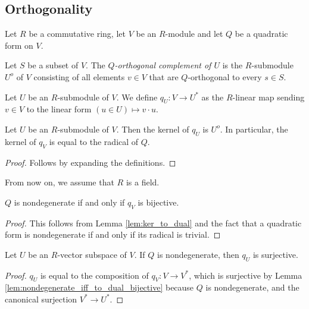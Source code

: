 \subsection{Orthogonality}\label{subsec:ortho}

Let $R$ be a commutative ring, let $V$ be an $R$-module and let $Q$ be a quadratic form on $V$.

\begin{definition}\label{def:ortho_compl}
\leanok
Let $S$ be a subset of $V$. The \emph{$Q$-orthogonal complement of $U$} is the $R$-submodule $U^o$ of $V$ consisting of all elements $v \in V$ that are $Q$-orthogonal to every $s \in S$.
\end{definition}

\begin{definition}\label{def:to_dual}
\leanok
Let $U$ be an $R$-submodule of $V$. We define $q_U : V \to U^*$ as the $R$-linear map sending $v \in V$ to the linear form $(u \in U) \mapsto v \cdot u$.
\end{definition}

\begin{lemma}\label{lem:ker_to_dual}
Let $U$ be an $R$-submodule of $V$. Then the kernel of $q_U$ is $U^o$. In particular, the kernel of $q_V$ is equal to the radical of $Q$.
\leanok
{}
\end{lemma}
\begin{proof}
\leanok
Follows by expanding the definitions.
\end{proof}

From now on, we assume that $R$ is a field.

\begin{lemma}\label{lem:nondegenerate_iff_to_dual_bijective}
\leanok
$Q$ is nondegenerate if and only if $q_V$ is bijective.
\end{lemma}
\begin{proof}
\leanok
This follows from Lemma \ref{lem:ker_to_dual} and the fact that a quadratic form is nondegenerate if and only if its radical is trivial.
\end{proof}

\begin{lemma}\label{lem:to_dual_surjective}
Let $U$ be an $R$-vector subspace of $V$. If $Q$ is nondegenerate, then $q_U$ is surjective.
\leanok
{}
\end{lemma}
\begin{proof}
\leanok
$q_U$ is equal to the composition of $q_V : V \to V^*$, which is surjective by Lemma \ref{lem:nondegenerate_iff_to_dual_bijective} because $Q$ is nondegenerate, and the canonical surjection $V^* \to U^*$.
\end{proof}

